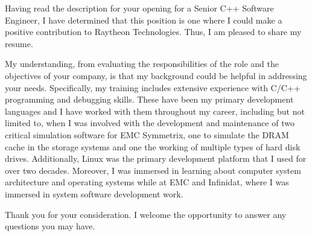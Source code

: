 \documentclass[busletter,dateno]{newlfm}
\begin{document}
\begin{newlfm}
Having read the description for your opening for a Senior C++ Software
Engineer, I have determined that this 
position is one where I could make a positive contribution to Raytheon Technologies.
Thus, I am pleased to share my resume.

My understanding, from evaluating the responsibilities of the role and the
objectives of your company, is that my background could be helpful in
addressing your needs. Specifically, my training includes extensive experience
with C/C++ programming and debugging skills. These have been my primary
development languages and I have worked with them throughout my career,
including but not limited to, when I was involved with the development and
maintenance of two critical simulation software for EMC Symmetrix, one to
simulate the DRAM cache in the storage systems and one the working of multiple
types of hard disk drives. Additionally, Linux was the primary development
platform that I used for over two decades. Moreover, I was immersed in
learning about computer system architecture and operating systems while at EMC
and Infinidat, where I was immersed in system software development work. 

Thank you for your consideration.  I welcome the opportunity to answer any
questions you may have. 
\end{newlfm}
\end{document}
